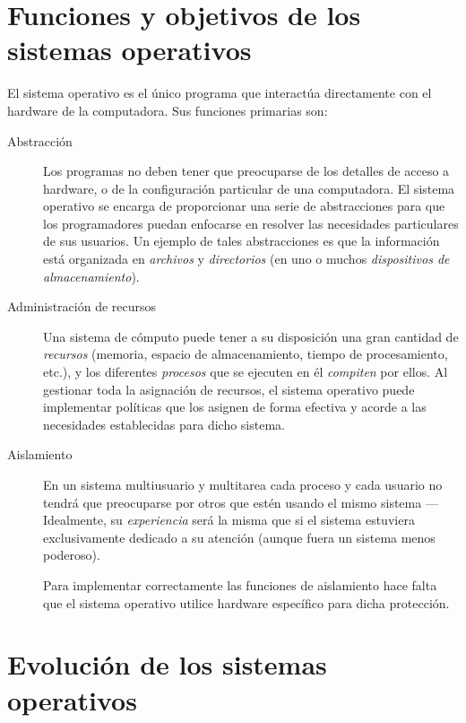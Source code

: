 \documentclass[11pt,fleqn]{book} %
\begin{document}
\section{Funciones y objetivos de los sistemas operativos}
\label{sec-1-2}


El sistema operativo es el único programa que interactúa directamente
con el hardware de la computadora. Sus funciones primarias son:

\begin{description}
\item[Abstracción] Los programas no deben tener que preocuparse de los
                 detalles de acceso a hardware, o de la configuración
                 particular de una computadora. El sistema operativo
                 se encarga de proporcionar una serie de abstracciones
                 para que los programadores puedan enfocarse en
                 resolver las necesidades particulares de sus
                 usuarios. Un ejemplo de tales abstracciones es que
                 la información está organizada en \emph{archivos} y
                 \emph{directorios} (en uno o muchos \emph{dispositivos de                  almacenamiento}).
\item[Administración de recursos] Una sistema de cómputo puede tener a su
     disposición una gran cantidad de \emph{recursos} (memoria, espacio de
     almacenamiento, tiempo de procesamiento, etc.), y los diferentes
     \emph{procesos} que se ejecuten en él \emph{compiten} por ellos. Al gestionar
     toda la asignación de recursos, el sistema operativo puede
     implementar políticas que los asignen de forma efectiva y acorde
     a las necesidades establecidas para dicho sistema.
\item[Aislamiento] En un sistema multiusuario y multitarea cada proceso 
		 y cada usuario no tendrá que
                 preocuparse por otros que estén usando el mismo
                 sistema — Idealmente, su \emph{experiencia} será la misma
                 que si el sistema estuviera exclusivamente dedicado a
                 su atención (aunque fuera un sistema menos
                 poderoso).

		 Para implementar correctamente las funciones de
		 aislamiento hace falta que el sistema operativo
		 utilice hardware específico para dicha protección.
\end{description}
\section{Evolución de los sistemas operativos}
\label{sec-1-3}
\end{document}
